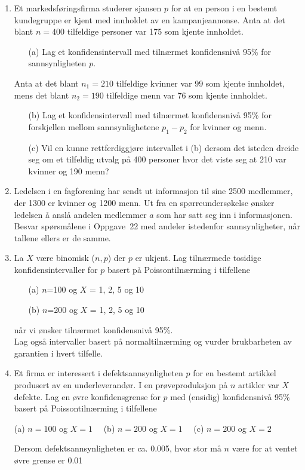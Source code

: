 \begin{enumerate}
\item Et markedsføringsfirma studerer sjansen $p$ for at en person
i en bestemt kundegruppe er kjent med innholdet av en
kampanjeannonse. Anta at det blant $n=400$ tilfeldige
personer var 175 som kjente innholdet.
\begin{itemize}
\item[(a)] Lag et konfidensintervall med tilnærmet konfidensnivå
95\% for sannsynligheten $p$.
\end{itemize}
Anta at det blant $n_1=210$ tilfeldige kvinner var 99 som
kjente innholdet, mens det blant $n_2=190$ tilfeldige menn
var 76 som kjente innholdet.
\begin{itemize}
\item[(b)] Lag et konfidensintervall med tilnærmet konfidensnivå
95\% for forskjellen mellom sannsynlighetene $p_1 - p_2$
for kvinner og menn.
\item[(c)] Vil en kunne rettferdiggjøre intervallet i (b) dersom
det isteden dreide seg om et tilfeldig utvalg på 400
personer hvor det viste seg at 210 var kvinner og 190 menn?
\end{itemize}

\item Ledelsen i en fagforening har sendt ut informasjon til sine
2500 medlemmer, der 1300 er kvinner og 1200 menn. Ut fra en
spørreundersøkelse ønsker ledelsen å anslå andelen medlemmer
$a$ som har satt seg inn i informasjonen. Besvar spørsmålene
i Oppgave~22 med andeler istedenfor sannsynligheter, når
tallene ellers er de samme.

\item La $X$ være binomisk ($n, p$) der $p$ er ukjent. 
Lag tilnærmede tosidige konfidensintervaller for $p$ basert på 
Poissontilnærming i tilfellene
\begin{itemize}
\item[(a)] $n$=100  og $X$ = 1, 2, 5 og 10
\item[(b)] $n$=200  og $X$ = 1, 2, 5 og 10
\end{itemize}
når vi ønsker tilnærmet konfidensnivå 95\%. \\
Lag også intervaller basert på normaltilnærming og vurder
brukbarheten av garantien i hvert tilfelle.

\item Et firma er interessert i defektsannsynligheten $p$ for en
bestemt artikkel produsert av en underleverandør. I en
prøveproduksjon på $n$ artikler var $X$ defekte. Lag en øvre
konfidensgrense for $p$ med (ensidig) konfidensnivå 95\%
basert på Poissontilnærming i tilfellene
\begin{center}
(a) $n=100$ og $X=1$ \ \ (b) $n=200$ og $X=1$ \ \ (c) $n=200$ og $X=2$
\end{center}
Dersom defektsannsynligheten er ca. 0.005, hvor stor må $n$
være for at ventet øvre grense er 0.01


\end{enumerate}
